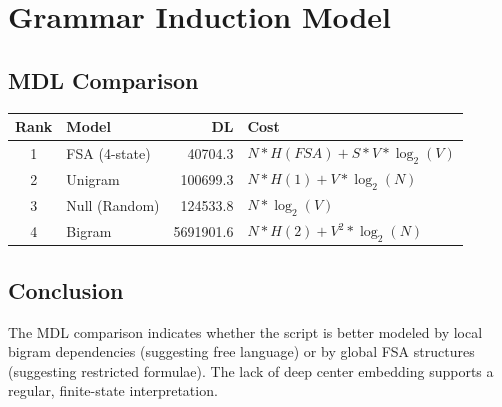 \section{Grammar Induction Model}

\subsection{MDL Comparison}
\begin{tabular}{clrl}
\toprule
\textbf{Rank} & \textbf{Model} & \textbf{DL} & \textbf{Cost} \\
\midrule
1 & FSA (4-state) & 40704.3 & $N*H(FSA) + S*V*\log_2(V)$ \\
2 & Unigram & 100699.3 & $N*H(1) + V*\log_2(N)$ \\
3 & Null (Random) & 124533.8 & $N * \log_2(V)$ \\
4 & Bigram & 5691901.6 & $N*H(2) + V^2*\log_2(N)$ \\
\bottomrule
\end{tabular}

\subsection{Conclusion}
The MDL comparison indicates whether the script is better modeled by local bigram dependencies (suggesting free language) or by global FSA structures (suggesting restricted formulae). The lack of deep center embedding supports a regular, finite-state interpretation.
